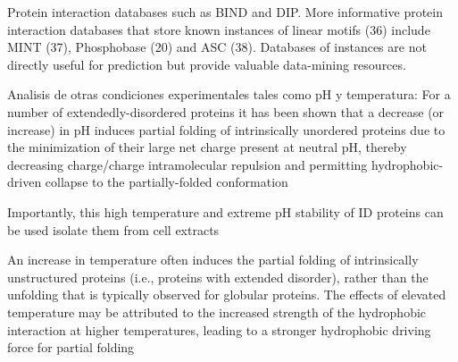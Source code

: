Protein interaction databases such as BIND and DIP. More informative protein interaction databases that store known instances of linear motifs (36) include MINT (37), Phosphobase (20) and ASC (38). 
Databases of instances are not directly useful for prediction but provide valuable data-mining resources.





Analisis de otras condiciones experimentales tales como pH y temperatura:
For a number of extendedly-disordered proteins it has been shown that a decrease (or increase) in pH induces partial folding of intrinsically unordered proteins due to the minimization of
their large net charge present at neutral pH, thereby decreasing charge/charge intramolecular repulsion and permitting hydrophobic-driven collapse to the partially-folded conformation

Importantly, this high temperature and extreme pH stability of ID proteins can be used isolate them from cell extracts

An increase in temperature often induces the partial folding of intrinsically unstructured
proteins (i.e., proteins with extended disorder), rather than the unfolding that is typically
observed for globular proteins. The effects of elevated temperature may be attributed to the
increased strength of the hydrophobic interaction at higher temperatures, leading to a stronger
hydrophobic driving force for partial folding
